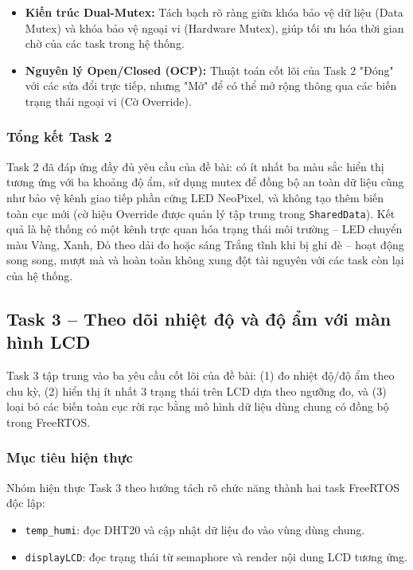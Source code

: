 \begin{itemize}
    \item \textbf{Kiến trúc Dual-Mutex:} Tách bạch rõ ràng giữa khóa bảo vệ dữ liệu (Data Mutex) và khóa bảo vệ ngoại vi (Hardware Mutex), giúp tối ưu hóa thời gian chờ của các task trong hệ thống.
    \item \textbf{Nguyên lý Open/Closed (OCP):} Thuật toán cốt lõi của Task 2 "Đóng" với các sửa đổi trực tiếp, nhưng "Mở" để có thể mở rộng thông qua các biến trạng thái ngoại vi (Cờ Override).
\end{itemize}

\subsubsection*{Tổng kết Task 2}

Task 2 đã đáp ứng đầy đủ yêu cầu của đề bài: có ít nhất ba màu sắc hiển thị tương ứng với ba khoảng độ ẩm, sử dụng mutex để đồng bộ an toàn dữ liệu cũng như bảo vệ kênh giao tiếp phần cứng LED NeoPixel, và không tạo thêm biến toàn cục mới (cờ hiệu Override được quản lý tập trung trong \texttt{SharedData}). Kết quả là hệ thống có một kênh trực quan hóa trạng thái môi trường -- LED chuyển màu Vàng, Xanh, Đỏ theo dải đo hoặc sáng Trắng tĩnh khi bị ghi đè -- hoạt động song song, mượt mà và hoàn toàn không xung đột tài nguyên với các task còn lại của hệ thống.
\subsection{Task 3 -- Theo dõi nhiệt độ và độ ẩm với màn hình LCD}

Task 3 tập trung vào ba yêu cầu cốt lõi của đề bài: (1) đo nhiệt độ/độ ẩm theo chu kỳ, (2) hiển thị ít nhất 3 trạng thái trên LCD dựa theo ngưỡng đo, và (3) loại bỏ các biến toàn cục rời rạc bằng mô hình dữ liệu dùng chung có đồng bộ trong FreeRTOS.

\subsubsection*{Mục tiêu hiện thực}

Nhóm hiện thực Task 3 theo hướng tách rõ chức năng thành hai task FreeRTOS độc lập:
\begin{itemize}
    \item \texttt{temp\_humi}: đọc DHT20 và cập nhật dữ liệu đo vào vùng dùng chung.
    \item \texttt{displayLCD}: đọc trạng thái từ semaphore và render nội dung LCD tương ứng.
\end{itemize}

